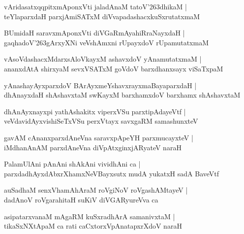 \documentclass[twoside,12pt,openright]{book}
\def\S{\char'263}
\newcounter{shloka}[chapter]
\begin{document}
\begin{shloka}
vAridasatxqqpitxmAponxVti jaladAnaM tatoV\S dhikaM |\\
teYlaparxdaH parxjAmiSATxM diVvapadashacxkuSxrutatxmaM 
\end{shloka}

\begin{shloka}
BUmidaH saravxmAponxVti diVGaRmAyahiRraNayxdaH |\\
gaqhadoV\S gArxyXNi veVshAmxni rUpayxdoV rUpamutatxmaM 
\end{shloka}

\begin{shloka}
vAsoVdashacxMdarxsAloVkayxM ashavxdoV yAnamutatxmaM |\\
ananxdAtA shirxyaM sevxVSATxM goVdoV barxdhanxsayx viSaTxpaM
\end{shloka}

\begin{shloka}
yAnashayAyxparxdoV BArAyxmeYshavxrayxmaBayaparxdaH |\\
dhAnayxdaH shAshavxtaM swKayxM barxhamxdoV barxhamx shAshavxtaM 
\end{shloka}

\begin{shloka}
dhAnAyxnayxpi yathAshakitx viperxVSu parxtipAdayeVtf |\\
veVdavidAyxvishiSeTxVSu perxVtayx savxgaRM samashunxteV 
\end{shloka}

\begin{shloka}
gavAM cAnanxparxdAneVna saravxpApeYH parxmucayxteV |\\
iMdhanAnAM parxdAneVna diVpAtxginxjARyateV naraH 
\end{shloka}

\begin{shloka}
PalamUlAni pAnAni shAkAni vividhAni ca |\\
parxdadhAyxdAbxrXhamxNeVBayxsutx mudA yukatxH sadA BaveVtf 
\end{shloka}

\begin{shloka}
auSadhaM senxVhamAhAraM roVgiNoV roVgashAMtayeV |\\
dadAnoV roVgarahitaH suKiV diVGARyureVva ca 
\end{shloka}

\begin{shloka}
asipatarxvanaM mAgaRM kuSxradhArA samanivxtaM |\\
tikaSxNXtApaM ca rati caCxtorxVpAnatapxrXdoV naraH 
\end{shloka}
\end{document}
